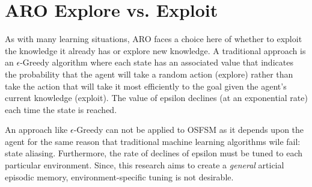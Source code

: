 \documentclass[letterpaper]{article} %
\begin{document}
\begin{table}[t]
\caption{Calculating expected value}\smallskip
\centering
{}
\label{tab1}
\end{table}

\section{ARO Explore vs. Exploit}

   
As with many learning situations, ARO faces a choice here of whether
to exploit the knowledge it already has or explore new knowledge.  A
traditional approach is an $\epsilon$-Greedy algorithm where each state
has an associated value that indicates the probability that the agent
will take a random action (explore) rather than take the action that
will take it most efficiently to the goal given the agent's current
knowledge (exploit).  The value of epsilon declines (at an exponential
rate) each time the state is reached.

An approach like $\epsilon$-Greedy can not be applied to OSFSM as it
depends upon the agent for the same reason that traditional machine
learning algorithms wile fail: state aliasing.  Furthermore, the rate
of declines of epsilon must be tuned to each particular environment.
Since, this research aims to create a \textit{general} articial
episodic memory, environment-specific tuning is not desirable.
\end{document}
